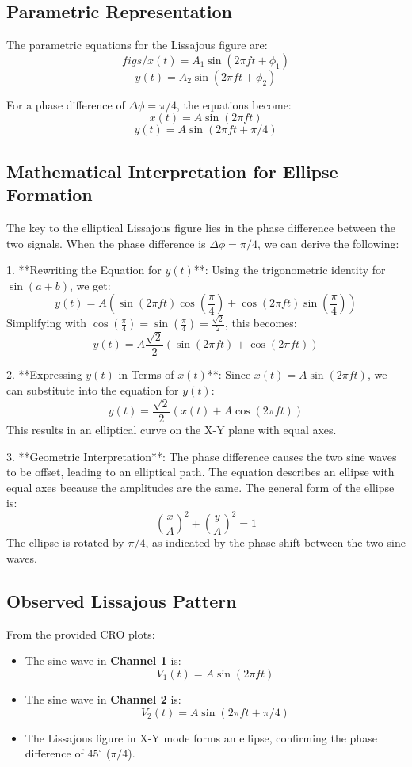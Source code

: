 \documentclass[12pt,a4paper]{report}
\begin{document}
\subsection*{Parametric Representation}
The parametric equations for the Lissajous figure are:
\[figs/
x(t) = A_1 \sin(2 \pi f t + \phi_1)
\]
\[
y(t) = A_2 \sin(2 \pi f t + \phi_2)
\]

For a phase difference of \(\Delta \phi = \pi/4\), the equations become:
\[
x(t) = A \sin(2 \pi f t)
\]
\[
y(t) = A \sin(2 \pi f t + \pi/4)
\]

\subsection*{Mathematical Interpretation for Ellipse Formation}
The key to the elliptical Lissajous figure lies in the phase difference between the two signals. When the phase difference is \( \Delta \phi = \pi/4 \), we can derive the following:

1. **Rewriting the Equation for \(y(t)\)**:
   Using the trigonometric identity for \( \sin(a + b) \), we get:
   \[
   y(t) = A \left( \sin(2 \pi f t) \cos\left(\frac{\pi}{4}\right) + \cos(2 \pi f t) \sin\left(\frac{\pi}{4}\right) \right)
   \]
   Simplifying with \( \cos\left(\frac{\pi}{4}\right) = \sin\left(\frac{\pi}{4}\right) = \frac{\sqrt{2}}{2} \), this becomes:
   \[
   y(t) = A \frac{\sqrt{2}}{2} \left( \sin(2 \pi f t) + \cos(2 \pi f t) \right)
   \]

2. **Expressing \(y(t)\) in Terms of \(x(t)\)**:
   Since \( x(t) = A \sin(2 \pi f t) \), we can substitute into the equation for \(y(t)\):
   \[
   y(t) = \frac{\sqrt{2}}{2} \left( x(t) + A \cos(2 \pi f t) \right)
   \]
   This results in an elliptical curve on the X-Y plane with equal axes.

3. **Geometric Interpretation**:
   The phase difference causes the two sine waves to be offset, leading to an elliptical path. The equation describes an ellipse with equal axes because the amplitudes are the same. The general form of the ellipse is:
   \[
   \left(\frac{x}{A}\right)^2 + \left(\frac{y}{A}\right)^2 = 1
   \]
   The ellipse is rotated by \( \pi/4 \), as indicated by the phase shift between the two sine waves.

\subsection*{Observed Lissajous Pattern}
From the provided CRO plots:
\begin{itemize}
    \item The sine wave in \textbf{Channel 1} is:
    \[
    V_1(t) = A \sin(2 \pi f t)
    \]
    \item The sine wave in \textbf{Channel 2} is:
    \[
    V_2(t) = A \sin(2 \pi f t + \pi/4)
    \]
    \item The Lissajous figure in X-Y mode forms an ellipse, confirming the phase difference of \(45^\circ\) (\(\pi/4\)).
\end{itemize}
\end{document}
